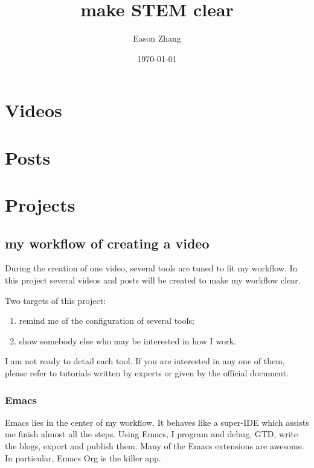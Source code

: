 \documentclass[koma,utopia,letterpaper,captions=tableheading,11pt,listings-sv,microtype,paralist,colorlinks=true,urlcolor=blue]{org-article}
\author{Eason Zhang}
\date{\today}
\title{make STEM clear}
\begin{document}
\maketitle
\tableofcontents


\section{Videos}
\label{sec:org998bcda}



\section{Posts}
\label{sec:org3d17ce5}



\section{Projects}
\label{sec:orgc54445f}


\subsection{my workflow of creating a video}
\label{sec:orgf0ee6dd}
During the creation of one video, several tools are tuned to fit my workflow. In
this project several videos and posts will be created to make my workflow clear.

Two targets of this project:
\begin{enumerate}
\item remind me of the configuration of several tools;
\item show somebody else who may be interested in how I work.
\end{enumerate}

I am not ready to detail each tool. If you are interested in any one of them,
please refer to tutorials written by experts or given by the official document.

\subsubsection{Emacs}
\label{sec:org0c108f2}


Emacs lies in the center of my workflow. It behaves like a super-IDE which
assists me finish almost all the steps. Using Emacs, I program and debug, GTD,
write the blogs, export and publish them. Many of the Emacs extensions are
awesome. In particular, Emacs Org is the killer app.
\end{document}
